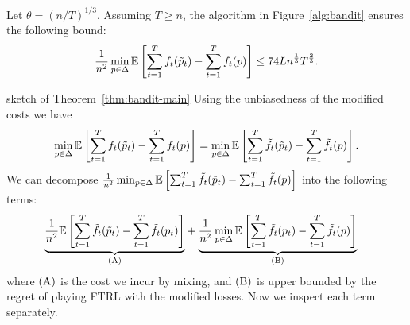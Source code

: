 \begin{theorem} \label{thm:bandit-main}
Let $\theta = (n/T)^{1/3}$.
Assuming $T \geq n$, the algorithm in Figure~\ref{alg:bandit} ensures the following bound:
\begin{equation*}
\frac{1}{n^2}\min_{p \in \Delta }  \mathbb{E}\left[    \sum_{t=1}^T f_t(\tilde{p}_t)  -  \sum_{t=1}^T f_t(p) \right] \leq 74Ln^{\frac{1}{3}}T^{\frac{2}{3}}.
\end{equation*}
\end{theorem}

\begin{proofarg}{sketch of Theorem~\ref{thm:bandit-main}}
Using the unbiasedness of the modified costs we have
\begin{equation*}
 \min_{p \in \Delta } \mathbb{E}\left[    \sum_{t=1}^T f_t(\tilde{p}_t)  - \sum_{t=1}^T f_t(p) \right] 
= \min_{p \in \Delta }  \mathbb{E}\left[    \sum_{t=1}^T \tilde{f}_t(\tilde{p}_t)  -  \sum_{t=1}^T \tilde{f}_t(p) \right] .
\end{equation*}
We can decompose $\frac{1}{n^2} \min_{p \in \Delta } \mathbb{E}\left[    \sum_{t=1}^T \tilde{f}_t(\tilde{p}_t)  -  \sum_{t=1}^T \tilde{f}_t(p) \right] $  into the following terms:
\begin{align*}
&\uann{ \frac{1}{n^2}\expval {\sumtt \tf_t(\tp_t) - \sumtt \tf_t(p_t)  } } {\rA} + \uann{\frac{1}{n^2} \min_{p \in \Delta } \expval{\sumtt \tf_t(p_t)  - \sumtt \tf_t(p)   } }{\rB}
\end{align*}
where $\rA$ is the cost we incur by mixing, and $\rB$ is upper bounded by the regret of playing FTRL with the modified losses. Now we inspect each term separately. 


\end{proofarg}
